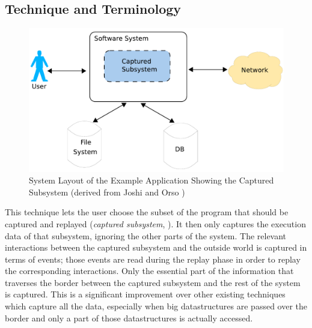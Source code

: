 \subsection{Technique and Terminology}

\begin{figure}[ht]
  \centering
  \includegraphics[width=1\textwidth]{illustrations/scr_overall_schema}
  \caption{System Layout of the Example Application Showing the Captured Subsystem (derived from Joshi and Orso \cite{orso05may})}
  \label{fig:scr_overall_schema}
\end{figure}

This technique lets the user choose the subset of the program that should be captured and replayed (\emph{captured subsystem}, ). It then only captures the execution data of that subsystem, ignoring the other parts of the system. The relevant interactions between the captured subsystem and the outside world is captured in terms of events; those events are read during the replay phase in order to replay the corresponding interactions. Only the essential part of the information that traverses the border between the captured subsystem and the rest of the system is captured. This is a significant improvement over other existing techniques which capture all the data, especially when big datastructures are passed over the border and only a part of those datastructures is actually accessed.

